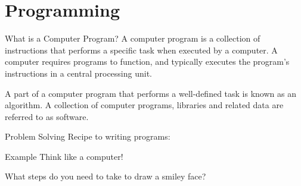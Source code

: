 \documentclass[../lecture1-introduction.tex]{subfiles}
\begin{document}
\section{Programming}


\begin{frame}[fragile]{What is a Computer Program?}
    A computer program is a collection of instructions that performs a specific
    task when executed by a computer. A computer requires programs to function,
    and typically executes the program's instructions in a central processing unit.

    A part of a computer program that performs a well-defined task is known as
    an algorithm. A collection of computer programs, libraries and related data
    are referred to as software.
\end{frame}


\begin{frame}[fragile]{Problem Solving}
    Recipe to writing programs:
\end{frame}


\begin{frame}[fragile]{Example}
    Think like a computer!

    What steps do you need to take to draw a smiley face?
\end{frame}

\end{document}
